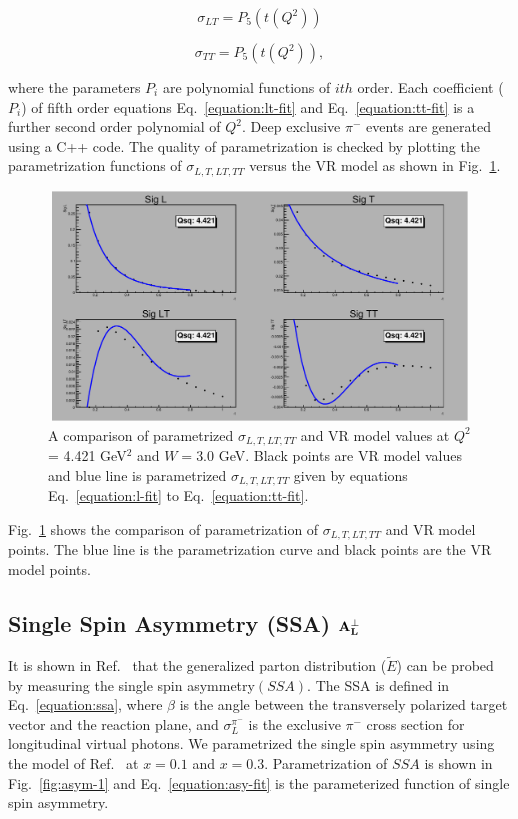 \begin{equation}
        \sigma_{LT} = P_{5}(t(Q^2))        
     \label{equation:lt-fit}
\end{equation}

\begin{equation}
        \sigma_{TT} = P_{5}(t(Q^2)),        
     \label{equation:tt-fit}
\end{equation}

where the parameters $P_{i}$ are polynomial functions of $ith$ order. Each coefficient ($P_{i}$) of fifth order equations 
Eq.~\ref{equation:lt-fit} and Eq.~\ref{equation:tt-fit} is a further second order polynomial of $Q^2$. Deep exclusive $\pi^{-}$ events are 
generated using a C++ code. The quality of parametrization is checked by plotting the parametrization functions of $\sigma_{L,T,LT,TT}$ 
versus the VR model as shown in Fig.~\ref{fig:sigall}.

\begin{figure}[!hbt]
    \centering
    \includegraphics[width=6.0in,height=2.4in]{./figures/pimFit.pdf}
    \caption{ A comparison of parametrized $\sigma_{L,T,LT,TT}$ and VR model values at $Q^2$ = 4.421 GeV$^2$ and $W = 3.0$ GeV.  
    Black points are VR model values and blue line is parametrized $\sigma_{L,T,LT,TT}$ given by equations 
    Eq.~\ref{equation:l-fit} to Eq.~\ref{equation:tt-fit}. }
    \label{fig:sigall}
\end{figure}

Fig.~\ref{fig:sigall} shows the comparison of parametrization of $\sigma_{L,T,LT,TT}$ and VR model points. The blue line is the 
parametrization curve and black points are the VR model points.

\subsection{Single Spin Asymmetry (SSA) $\bf{A_{L}^{\perp}}$ }
It is shown in Ref.~\cite{frankfurt} that the generalized parton distribution ($\tilde{E}$) can be probed by measuring the single spin 
asymmetry$(SSA)$. The SSA is defined in Eq.~\ref{equation:ssa}, where $\beta$ is the angle between the transversely polarized 
target vector and the reaction plane, and $\sigma_{L}^{\pi^{-}}$ is the exclusive $\pi^{-}$ cross section for longitudinal virtual photons. 
We parametrized the single spin asymmetry using the model of Ref.~\cite{frankfurt} at $x = 0.1$ and $x = 0.3$. Parametrization of $SSA$ 
is shown in Fig.~\ref{fig:asym-1} and Eq.~\ref{equation:asy-fit} is the parameterized function of single spin asymmetry.

